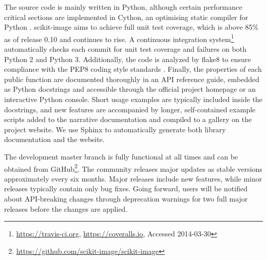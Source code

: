   The source code is mainly written in Python, although certain performance critical sections are implemented in Cython, an optimising static compiler for Python \citep{Cython}. scikit-image aims to achieve full unit test coverage, which is above 85\% as of release 0.10 and continues to rise. A continuous integration system\footnote{\url{https://travis-ci.org}, \url{https://coveralls.io}, Accessed 2014-03-30} automatically checks each commit for unit test coverage and failures on both Python 2 and Python 3. Additionally, the code is analyzed by flake8 \citep{flake8} to ensure compliance with the PEP8 coding style standards \citep{PEP8}. Finally, the properties of each public function are documented thoroughly in an API reference guide, embedded as Python docstrings and accessible through the official project homepage or an interactive Python console. Short usage examples are typically included inside the docstrings, and new features are accompanied by longer, self-contained example scripts added to the narrative documentation and compiled to a gallery on the project website. We use Sphinx \citep{Sphinx} to automatically generate both library documentation and the website.

  The development master branch is fully functional at all times and can be obtained from GitHub\footnote{\url{https://github.com/scikit-image/scikit-image}}. The community releases major updates as stable versions approximately every six months. Major releases include new features, while minor releases typically contain only bug fixes. Going forward, users will be notified about API-breaking changes through deprecation warnings for two full major releases before the changes are applied.
